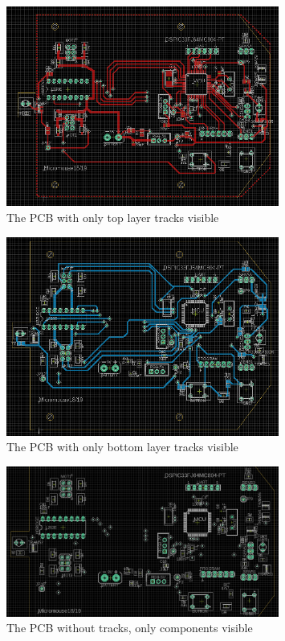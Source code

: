\begin{figure}[htb]
    \centering
    \includegraphics[width=0.8\textwidth]{figures/hardware/PCB_Top.PNG}
    \caption{The PCB with only top layer tracks visible}
    \label{fig:top}
\end{figure}

\begin{figure}[htb]
    \centering
    \includegraphics[width=0.8\textwidth]{figures/hardware/PCB_Bottom.PNG}
    \caption{The PCB with only bottom layer tracks visible}
    \label{fig:bottom}
\end{figure}

\begin{figure}[htb]
    \centering
    \includegraphics[width=0.8\textwidth]{figures/hardware/PCB_Components.PNG}
    \caption{The PCB without tracks, only components visible}
    \label{fig:comp}
\end{figure}

